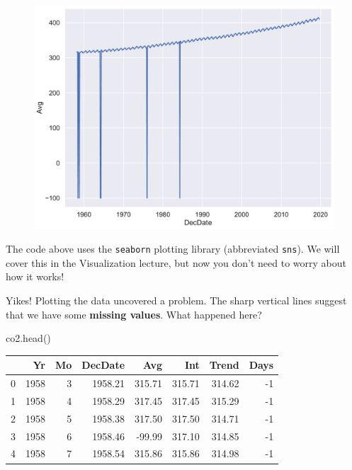 \documentclass[
  letterpaper,
  DIV=11,
  numbers=noendperiod]{scrreprt}
\newenvironment{Shaded}{\begin{snugshade}}{\end{snugshade}}
\newcommand{\NormalTok}[1]{\textcolor[rgb]{0.00,0.23,0.31}{#1}}
\begin{document}
\begin{figure}[H]

{\centering \includegraphics{eda/eda_files/figure-pdf/cell-62-output-1.pdf}

}

\end{figure}

The code above uses the \texttt{seaborn} plotting library (abbreviated
\texttt{sns}). We will cover this in the Visualization lecture, but now
you don't need to worry about how it works!

Yikes! Plotting the data uncovered a problem. The sharp vertical lines
suggest that we have some \textbf{missing values}. What happened here?

\begin{Shaded}
\begin{Highlighting}[]
\NormalTok{co2.head()}
\end{Highlighting}
\end{Shaded}

\begin{tabular}{lrrrrrrr}
\toprule
{} &    Yr &  Mo &  DecDate &    Avg &    Int &  Trend &  Days \\
\midrule
0 &  1958 &   3 &  1958.21 & 315.71 & 315.71 & 314.62 &    -1 \\
1 &  1958 &   4 &  1958.29 & 317.45 & 317.45 & 315.29 &    -1 \\
2 &  1958 &   5 &  1958.38 & 317.50 & 317.50 & 314.71 &    -1 \\
3 &  1958 &   6 &  1958.46 & -99.99 & 317.10 & 314.85 &    -1 \\
4 &  1958 &   7 &  1958.54 & 315.86 & 315.86 & 314.98 &    -1 \\
\bottomrule
\end{tabular}
\end{document}
